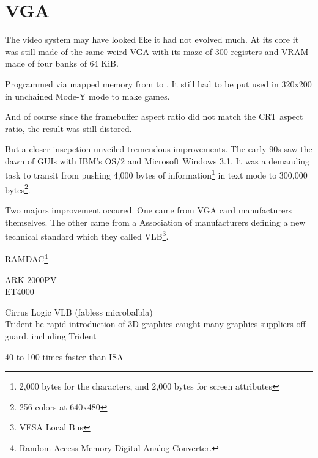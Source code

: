 \section{VGA}
The video system may have looked like it had not evolved much. At its core it was still made of the same weird VGA with its maze of 300 registers and VRAM made of four banks of 64 KiB.\\
\par 
{}
\par
{}
\par
{}
\par
Programmed via mapped memory from  to . It still had to be put used in 320x200 in unchained Mode-Y mode to make games.\\
\par
{}
\par
And of course since the framebuffer aspect ratio did not match the CRT aspect ratio, the result was still distored.
\par
{}
\par
But a closer insepction unveiled tremendous improvements. The early 90s saw the dawn of GUIs with IBM's OS/2 and Microsoft Windows 3.1. It was a demanding task to transit from pushing 4,000 bytes of information\footnote{2,000 bytes for the characters, and 2,000 bytes for screen attributes} in text mode to 300,000 bytes\footnote{256 colors at 640x480}.\\
\par
{}
\par
Two majors improvement occured. One came from VGA card manufacturers themselves. The other came from a Association of manufacturers defining a new technical standard which they called VLB\footnote{VESA Local Bus}.\\ 
\par



RAMDAC\footnote{Random Access Memory Digital-Analog Converter.}
\par
ARK 2000PV\\
ET4000\\
\par
Cirrus Logic VLB (fabless microbalbla)\\
Trident he rapid introduction of 3D graphics caught many graphics suppliers off guard, including Trident\\
\par
\par
40 to 100 times faster than ISA\\
\par
